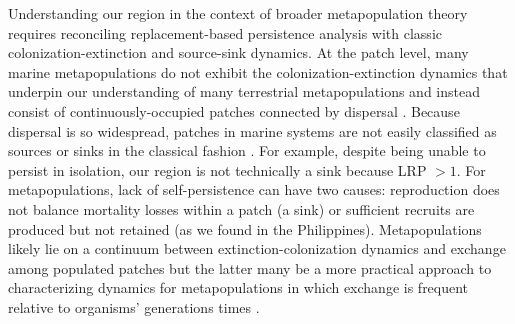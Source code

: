 \documentclass[12pt, oneside]{article}   	%
\begin{document}
Understanding our region in the context of broader metapopulation theory requires reconciling replacement-based persistence analysis with classic colonization-extinction and source-sink dynamics. At the patch level, many marine metapopulations do not exhibit the colonization-extinction dynamics \citep[or do only on a decades to centuries timescale,][]{smedbol2002myths} that underpin our understanding of many terrestrial metapopulations \citep[e.g,][]{hanski1998metapopulation, moilanen1998long} and instead consist of continuously-occupied patches connected by dispersal \citep{kritzer2006marine}. Because dispersal is so widespread, patches in marine systems are not easily classified as sources or sinks in the classical fashion \citep{figueira2006defining, white2011oceanographic}. For example, despite being unable to persist in isolation, our region is not technically a sink \citep{pulliam1988sources} because LRP $> 1$. For metapopulations, lack of self-persistence can have two causes: reproduction does not balance mortality losses within a patch (a sink) or sufficient recruits are produced but not retained (as we found in the Philippines). Metapopulations likely lie on a continuum between extinction-colonization dynamics and exchange among populated patches \citep{kritzer2006marine} but the latter many be a more practical approach to characterizing dynamics for metapopulations in which exchange is frequent relative to organisms' generations times \citep{hastings_persistence_2006}. %

\end{document}
